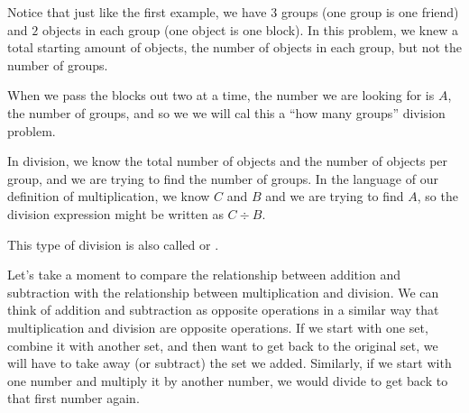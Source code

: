 \documentclass{ximera}
\begin{document}
 Notice that just like the first example, we have $3$ groups (one group is one friend) and $2$ objects in each group (one object is one block). In this problem, we knew a total starting amount of objects,  the number of objects in each group, but not the number of groups. 

When we pass the blocks out two at a time, the number we are looking for is $A$, the number of groups, and so we we will cal this a ``how many groups'' division problem. 

\begin{definition}
In  division, we know the total number of objects and the number of objects per group, and we are trying to find the number of groups. In the language of our definition of multiplication, we know $C$ and $B$ and we are trying to find $A$, so the division expression might be written as $C \div B$.
\begin{image}
\end{image}

This type of division is also called  or .
\end{definition}


Let's take a moment to compare the relationship between addition and subtraction with the relationship between multiplication and division. We can think of addition and subtraction as opposite operations in a similar way that multiplication and division are opposite operations. If we start with one set, combine it with another set, and then want to get back to the original set, we will have to take away (or subtract) the set we added. Similarly, if we start with one number and multiply it by another number, we would divide to get back to that first number again. 
\end{document}
